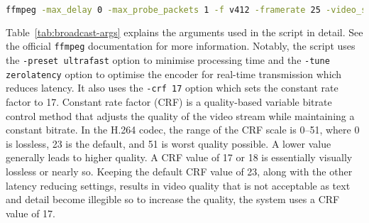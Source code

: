 \begin{lstlisting}[language=bash]
  ffmpeg -max_delay 0 -max_probe_packets 1 -f v412 -framerate 25 -video_size 720x576 -threads 1 -i /dev/video0 -vcodec libx264 -pix_fmt:v yuv420p -g:v 1 -preset ultrafast -tune zerolatency -crf 17 -max_delay 0 -fflags +nobuffer -flags low_delay -f rtp -muxdelay 0 rtp://192.168.20.20:42423
\end{lstlisting}

Table~\ref{tab:broadcast-args} explains the arguments used in the script in detail. See the official \texttt{ffmpeg} documentation for more information\cite{ffmpegDocumentation}. Notably, the script uses the \texttt{-preset ultrafast} option to minimise processing time and the \linebreak \texttt{-tune zerolatency} option to optimise the encoder for real-time transmission which reduces latency. It also uses the \texttt{-crf 17} option which sets the constant rate factor to 17. Constant rate factor (CRF) is a quality-based variable bitrate control method that adjusts the quality of the video stream while maintaining a constant bitrate. In the H.264 codec, the range of the CRF scale is 0–51, where 0 is lossless, 23 is the default, and 51 is worst quality possible. A lower value generally leads to higher quality. A CRF value of 17 or 18 is essentially visually lossless or nearly so\cite{ffmpegEncodeH264x2013}. Keeping the default CRF value of 23, along with the other latency reducing settings, results in video quality that is not acceptable as text and detail become illegible so to increase the quality, the system uses a CRF value of 17.

